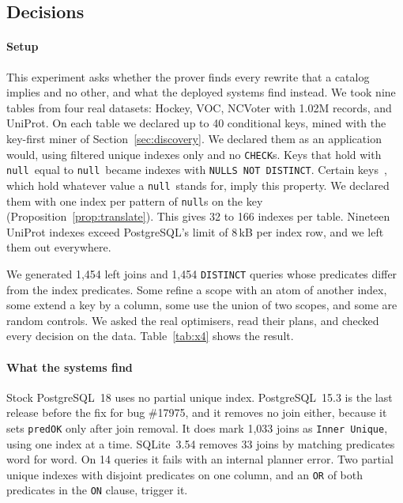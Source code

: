 \documentclass[conference]{IEEEtran}
\theoremstyle{definition}
\newcommand{\sql}[1]{\texttt{#1}}
\newcommand{\nul}{\texttt{null}}
\begin{document}
\subsection{Decisions}\label{sec:exp-decisions}

\paragraph*{Setup} This experiment asks whether the prover finds every rewrite that a catalog implies and no other,
and what the deployed systems find instead. We took nine tables from four real datasets: Hockey, VOC, NCVoter with
1.02M records, and UniProt. On each table we declared up to 40 conditional keys, mined with the key-first miner of
Section~\ref{sec:discovery}. We declared them as an application would, using filtered unique indexes only and no
\sql{CHECK}s. Keys that hold with \nul\ equal to \nul\ became indexes with \sql{NULLS NOT DISTINCT}. Certain
keys~\cite{KLZ15}, which hold whatever value a \nul\ stands for, imply this property. We declared them with one index per
pattern of \nul s on the key (Proposition~\ref{prop:translate}). This gives 32 to 166 indexes per table. Nineteen UniProt
indexes exceed PostgreSQL's limit of 8\,kB per index row, and we left them out everywhere.

We generated 1{,}454 left joins and 1{,}454 \sql{DISTINCT} queries whose predicates differ from the index predicates.
Some refine a scope with an atom of another index, some extend a key by a column, some use the union of two scopes, and
some are random controls. We asked the real optimisers, read their plans, and checked every decision on the data.
Table~\ref{tab:x4} shows the result.

\paragraph*{What the systems find} Stock PostgreSQL~18 uses no partial unique index. PostgreSQL~15.3 is the last
release before the fix for bug \#17975, and it removes no join either, because it sets \sql{predOK} only after join
removal. It does mark 1{,}033 joins as \sql{Inner Unique}, using one index at a time. SQLite~3.54 removes 33 joins by
matching predicates word for word. On 14 queries it fails with an internal planner error. Two partial unique indexes with
disjoint predicates on one column, and an \sql{OR} of both predicates in the \sql{ON} clause, trigger it.
\end{document}

